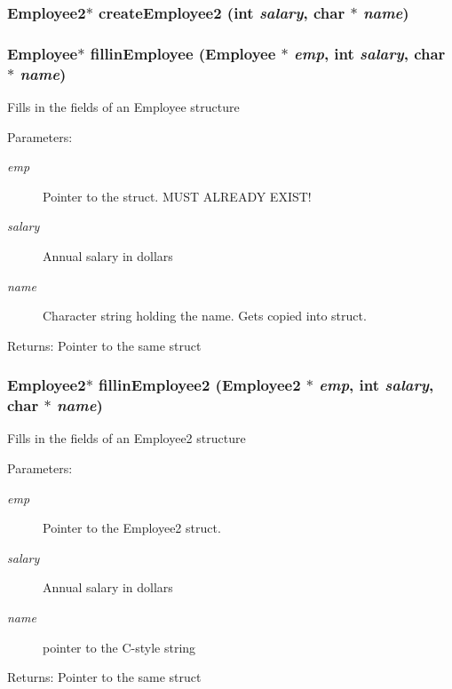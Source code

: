 \subsubsection{\setlength{\rightskip}{0pt plus 5cm}\bf{Employee2}$\ast$ create\-Employee2 (int {\em salary}, char $\ast$ {\em name})}\label{etest_8h_a71e796ab3d70e452c5693e15f7d5f8a}


\subsubsection{\setlength{\rightskip}{0pt plus 5cm}\bf{Employee}$\ast$ fillin\-Employee (\bf{Employee} $\ast$ {\em emp}, int {\em salary}, char $\ast$ {\em name})}\label{etest_8h_cff08fb0ab125ccc30b9aa63cef86f36}


Fills in the fields of an Employee structure \begin{Desc}
\item[Parameters:]
\begin{description}
\item[{\em emp}]Pointer to the struct. MUST ALREADY EXIST! \item[{\em salary}]Annual salary in dollars \item[{\em name}]Character string holding the name. Gets copied into struct. \end{description}
\end{Desc}
\begin{Desc}
\item[Returns:]Pointer to the same struct \end{Desc}
\subsubsection{\setlength{\rightskip}{0pt plus 5cm}\bf{Employee2}$\ast$ fillin\-Employee2 (\bf{Employee2} $\ast$ {\em emp}, int {\em salary}, char $\ast$ {\em name})}\label{etest_8h_86cf0d1af979fb191ae4acddeded053e}


Fills in the fields of an Employee2 structure \begin{Desc}
\item[Parameters:]
\begin{description}
\item[{\em emp}]Pointer to the Employee2 struct. \item[{\em salary}]Annual salary in dollars \item[{\em name}]pointer to the C-style string \end{description}
\end{Desc}
\begin{Desc}
\item[Returns:]Pointer to the same struct \end{Desc}
